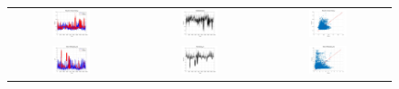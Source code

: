\begin{figure}[ht!]
  \centering
  \begin{tabular}{ccc}
    \includegraphics[width=0.32\textwidth]{graphs/hybrid/672 hours/mean_fr/actual vs forecast.jpg} &
    \includegraphics[width=0.32\textwidth]{graphs/hybrid/672 hours/mean_fr/residuals.jpg} &
    \includegraphics[width=0.32\textwidth]{graphs/hybrid/672 hours/mean_fr/scatter plot.jpg} \\
    \includegraphics[width=0.32\textwidth]{graphs/hybrid/672 hours/s_wht/actual vs forecast.jpg} &
    \includegraphics[width=0.32\textwidth]{graphs/hybrid/672 hours/s_wht/residuals.jpg} &
    \includegraphics[width=0.32\textwidth]{graphs/hybrid/672 hours/s_wht/scatter plot.jpg} \\

\end{tabular}
\end{figure}
